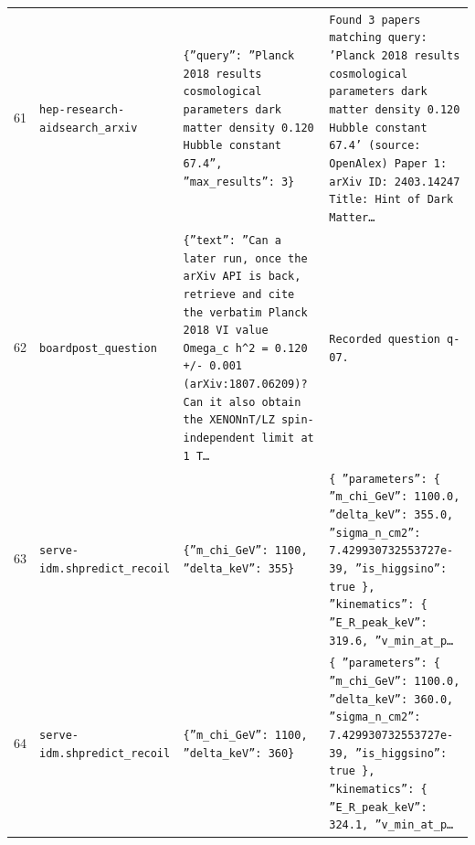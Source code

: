 \documentclass[11pt,a4paper]{article}
\begin{document}
\begin{longtable}{@{}p{}p{}p{}p{}@{}}
61 & \texttt{hep-research-aid}\newline\texttt{search\_\allowbreak{}arxiv} & \texttt{\{''query'':\allowbreak{} ''Planck 2018 results cosmological parameters dark matter density 0.120 Hubble constant 67.4'',\allowbreak{} ''max\_\allowbreak{}results'':\allowbreak{} 3\}\allowbreak{}} & \texttt{Found 3 papers matching query:\allowbreak{} 'Planck 2018 results cosmological parameters dark matter density 0.120 Hubble constant 67.4' (source:\allowbreak{} OpenAlex)\allowbreak{}  Paper 1:\allowbreak{} arXiv ID:\allowbreak{} 2403.14247 Title:\allowbreak{} Hint of Dark Matter\ldots{}\allowbreak{}} \\
62 & \texttt{board}\newline\texttt{post\_\allowbreak{}question} & \texttt{\{''text'':\allowbreak{} ''Can a later run,\allowbreak{} once the arXiv API is back,\allowbreak{} retrieve and cite the verbatim Planck 2018 VI value Omega\_\allowbreak{}c h\textasciicircum{}\allowbreak{}2 =\allowbreak{} 0.120 +/\allowbreak{}- 0.001 (arXiv:\allowbreak{}1807.06209)\allowbreak{}? Can it also obtain the XENONnT/\allowbreak{}LZ spin-independent limit at 1 T\ldots{}\allowbreak{}} & \texttt{Recorded question q-07.} \\
63 & \texttt{serve-idm.sh}\newline\texttt{predict\_\allowbreak{}recoil} & \texttt{\{''m\_\allowbreak{}chi\_\allowbreak{}GeV'':\allowbreak{} 1100,\allowbreak{} ''delta\_\allowbreak{}keV'':\allowbreak{} 355\}\allowbreak{}} & \texttt{\{   ''parameters'':\allowbreak{} \{     ''m\_\allowbreak{}chi\_\allowbreak{}GeV'':\allowbreak{} 1100.0,\allowbreak{}     ''delta\_\allowbreak{}keV'':\allowbreak{} 355.0,\allowbreak{}     ''sigma\_\allowbreak{}n\_\allowbreak{}cm2'':\allowbreak{} 7.429930732553727e-39,\allowbreak{}     ''is\_\allowbreak{}higgsino'':\allowbreak{} true   \}\allowbreak{},\allowbreak{}   ''kinematics'':\allowbreak{} \{     ''E\_\allowbreak{}R\_\allowbreak{}peak\_\allowbreak{}keV'':\allowbreak{} 319.6,\allowbreak{}     ''v\_\allowbreak{}min\_\allowbreak{}at\_\allowbreak{}p\ldots{}\allowbreak{}} \\
64 & \texttt{serve-idm.sh}\newline\texttt{predict\_\allowbreak{}recoil} & \texttt{\{''m\_\allowbreak{}chi\_\allowbreak{}GeV'':\allowbreak{} 1100,\allowbreak{} ''delta\_\allowbreak{}keV'':\allowbreak{} 360\}\allowbreak{}} & \texttt{\{   ''parameters'':\allowbreak{} \{     ''m\_\allowbreak{}chi\_\allowbreak{}GeV'':\allowbreak{} 1100.0,\allowbreak{}     ''delta\_\allowbreak{}keV'':\allowbreak{} 360.0,\allowbreak{}     ''sigma\_\allowbreak{}n\_\allowbreak{}cm2'':\allowbreak{} 7.429930732553727e-39,\allowbreak{}     ''is\_\allowbreak{}higgsino'':\allowbreak{} true   \}\allowbreak{},\allowbreak{}   ''kinematics'':\allowbreak{} \{     ''E\_\allowbreak{}R\_\allowbreak{}peak\_\allowbreak{}keV'':\allowbreak{} 324.1,\allowbreak{}     ''v\_\allowbreak{}min\_\allowbreak{}at\_\allowbreak{}p\ldots{}\allowbreak{}} \\

\end{longtable}
\end{document}
